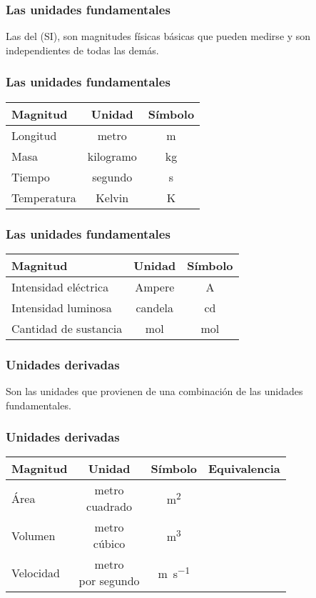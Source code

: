 \documentclass[14pt]{beamer}
\begin{document}
\begin{frame}
\frametitle{Las unidades fundamentales}
Las  del  (SI), son magnitudes físicas básicas que pueden medirse y son independientes de todas las demás.
\end{frame}
\begin{frame}
\frametitle{Las unidades fundamentales}
\begin{table}
\renewcommand{\arraystretch}{1.1}
\centering
\begin{tabular}{l | c | c}
Magnitud & Unidad & Símbolo \\ \hline 
Longitud & metro & \unit{m} \\ \hline \pause
Masa & kilogramo & \unit{\kilo\gram} \\ \hline
Tiempo & segundo & \unit{\second} \\ \hline
Temperatura & Kelvin & \unit{\kelvin} \\ \hline
\end{tabular}
\end{table}
\end{frame}
\begin{frame}
\frametitle{Las unidades fundamentales}
\begin{table}
\renewcommand{\arraystretch}{1.1}
\centering
\begin{tabular}{l | c | c}
Magnitud & Unidad & Símbolo \\ \hline 
Intensidad eléctrica & Ampere & \unit{\ampere} \\ \hline
Intensidad luminosa & candela & cd \\ \hline
Cantidad de sustancia & mol & \unit{mol}\\ \hline
\end{tabular}
\end{table}
\end{frame}
\begin{frame}
\frametitle{Unidades derivadas}
Son las unidades que provienen de una combinación de las unidades fundamentales.
\end{frame}
\begin{frame}
\frametitle{Unidades derivadas}
\begin{table}
\renewcommand{\arraystretch}{1.1}
\centering
\begin{tabular}{l | c | c | c}
Magnitud & Unidad & Símbolo & Equivalencia\\ \hline 
Área & \makecell{metro \\ cuadrado} & \unit{\square\meter} &  \\ \hline
Volumen & \makecell{metro \\ cúbico} & \unit{\cubic\meter} &  \\ \hline
Velocidad & \makecell{metro \\ por segundo} & \unit{\meter\per\second} & \\ \hline
\end{tabular}
\end{table}
\end{frame}
\end{document}
